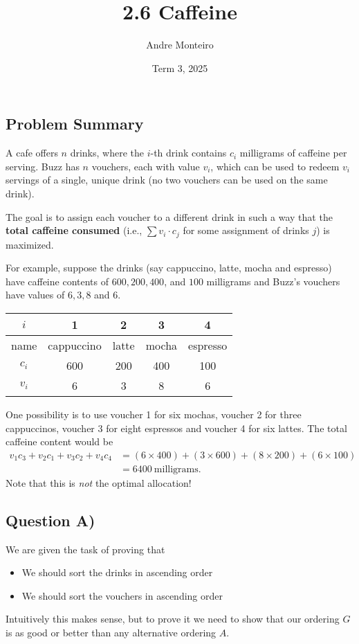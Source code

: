 \documentclass[12pt]{article}
\title{2.6 Caffeine}
\author{Andre Monteiro}
\date{Term 3, 2025}
\begin{document}
\maketitle
\newpage
\subsection*{Problem Summary}

A cafe offers $n$ drinks, where the $i$-th drink contains $c_i$ milligrams of caffeine per serving. Buzz has $n$ vouchers, each with value $v_i$, which can be used to redeem $v_i$ servings of a single, unique drink (no two vouchers can be used on the same drink).

The goal is to assign each voucher to a different drink in such a way that the \textbf{total caffeine consumed} (i.e., $\sum v_i \cdot c_j$ for some assignment of drinks $j$) is maximized.


For example, suppose the drinks (say cappuccino, latte, mocha and espresso) have caffeine contents of $600, 200, 400$, and $100$ milligrams and Buzz's vouchers have values of $6, 3, 8$ and $6$.
\begin{center}
\begin{tabular}{|c|c|c|c|c|}
    \hline 
    \(i\) & 1 & 2 & 3 & 4  \\ \hline 
    name & cappuccino & latte & mocha & espresso \\ \hline
    \(c_i\) & 600 & 200 & 400 & 100 \\ \hline
    \(v_i\) & 6 & 3 & 8 & 6 \\ \hline
\end{tabular}
\end{center}
One possibility is to use voucher 1 for six mochas, voucher 2 for three cappuccinos, voucher 3 for eight espressos and voucher 4 for six lattes. The total caffeine content would be 
\begin{align*}
    v_1c_3 + v_2c_1 + v_3c_2 + v_4c_4 &= (6\times400)+(3\times600)+(8\times200)+(6\times100) \\
    &= 6400\ \text{milligrams}.
\end{align*}
    Note that this is \textit{not} the optimal allocation!
\newpage 

\subsection*{Question A)} 

We are given the task of proving that 
\begin{itemize}
    \item We should sort the drinks in ascending order 
    \item We should sort the vouchers in ascending order 
\end{itemize}    
Intuitively this makes sense, but to prove it we need to show that our ordering $G$ is as good or better than any alternative ordering $A$.
\end{document}

